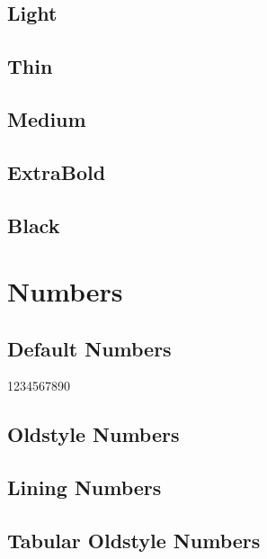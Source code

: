 \documentclass[12pt]{article}
\begin{document}
\subsection*{Light}\AlegreyaSansLight

\lipsum[1]

\subsection*{Thin}\AlegreyaSansThin

\lipsum[2]

\subsection*{Medium}\AlegreyaSansMedium

\lipsum[3]

\subsection*{ExtraBold}\AlegreyaSansExtraBold

\lipsum[4]

\subsection*{Black}\AlegreyaSansBlack

\lipsum[5]

\section{Numbers}\rm

\subsection*{Default Numbers}

1234567890

\subsection*{Oldstyle Numbers}

{}

\subsection*{Lining Numbers}

{}

\subsection*{Tabular Oldstyle Numbers}
\end{document}
